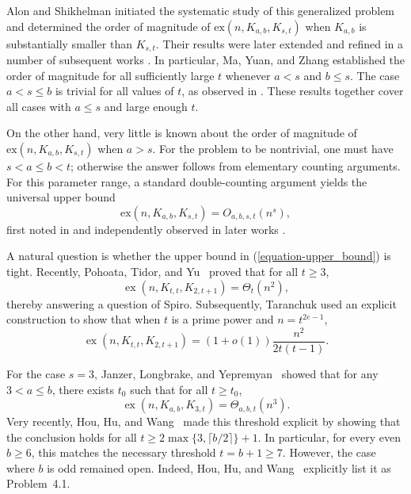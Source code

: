 \documentclass[11pt,a4paper]{article}
\theoremstyle{definition}
\theoremstyle{remark}
\newcommand{\ex}{\operatorname{ex}}
\begin{document}
Alon and Shikhelman \cite{alon2016many} initiated the systematic study of this generalized problem and determined the order of magnitude of $\mathrm{ex}(n, K_{a,b}, K_{s,t})$ when $K_{a,b}$ is substantially smaller than $K_{s,t}$. Their results were later extended and refined in a number of subsequent works \cite{ma2020generalized, Bay, Ger22}. In particular, Ma, Yuan, and Zhang \cite{ma2020generalized} established the order of magnitude for all sufficiently large $t$ whenever $a < s$ and $b \le s$. The case $a < s \le b$ is trivial for all values of $t$, as observed in \cite{Ger22}. These results together cover all cases with $a \le s$ and  large enough $t$.

On the other hand, very little is known about the order of magnitude of  $\mathrm{ex}(n, K_{a,b}, K_{s,t})$ when $a > s$. For the problem to be nontrivial, one must have $s < a \le b < t$; otherwise the answer follows from elementary counting arguments. For this parameter range, a standard double-counting argument yields the universal upper bound
\begin{equation}\label{equation-upper_bound}
\mathrm{ex}(n, K_{a,b}, K_{s,t}) = O_{a,b,s,t}(n^s),
\end{equation}
first noted in \cite{Ger19} and independently observed in later works \cite{janzer2026generalized, pohoata2026k2t1free}. 

A natural question is whether the upper bound in (\ref{equation-upper_bound}) is tight. 
Recently, Pohoata, Tidor, and Yu~\cite{pohoata2026k2t1free} proved that for all $t \ge 3$,
\begin{equation*}
\ex(n, K_{t,t}, K_{2,t+1}) = \Theta_t(n^2),
\end{equation*}
thereby answering a question of Spiro. %
Subsequently, Taranchuk \cite{Ta} used an explicit construction to show that when $t$ is a prime power and $n = t^{2e-1}$,
\begin{equation*}
\ex(n, K_{t,t}, K_{2,t+1}) = (1 + o(1))\frac{n^2}{2t(t - 1)}.
\end{equation*}

For the case $s=3$, Janzer, Longbrake, and Yepremyan~\cite{janzer2026generalized} showed that for any $3 < a \le b$, there exists $t_0$ such that for all $t \ge t_0$,
\begin{equation*}
\ex(n, K_{a,b}, K_{3,t}) = \Theta_{a,b,t}(n^3).
\end{equation*}
Very recently, Hou, Hu, and Wang~\cite{hou2026explicit} made this threshold explicit by showing that the conclusion holds for all $t\geq 2\max\{3,\lceil b/2\rceil\}+1$. In particular, for every even $b \geq 6$, this matches the necessary threshold $t = b+1\geq7$. However, the case where $b$ is odd remained open. Indeed, Hou, Hu, and Wang~\cite{hou2026explicit} explicitly list it as Problem~4.1. 
\end{document}
